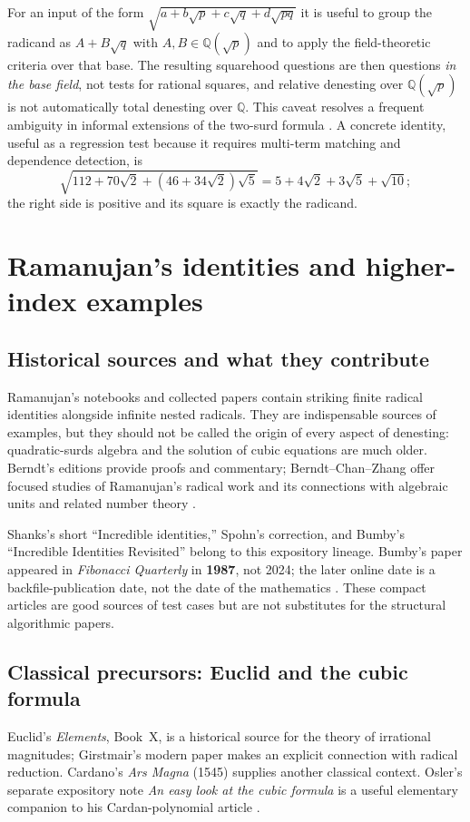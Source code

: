 \documentclass[11pt,oneside]{article}
\numberwithin{equation}{section}
\theoremstyle{definition}
\theoremstyle{remark}
\newcommand{\Q}{\mathbb{Q}}
\begin{document}
For an input of the form $\sqrt{a+b\sqrt p+c\sqrt q+d\sqrt{pq}}$ it is useful to group the radicand as $A+B\sqrt q$ with $A,B\in\Q(\sqrt p)$ and to apply the field-theoretic criteria over that base. The resulting squarehood questions are then questions \emph{in the base field}, not tests for rational squares, and relative denesting over $\Q(\sqrt p)$ is not automatically total denesting over $\Q$. This caveat resolves a frequent ambiguity in informal extensions of the two-surd formula \cite{bfht,mo}. A concrete identity, useful as a regression test because it requires multi-term matching and dependence detection, is
\begin{equation}\label{eq:multi}
\sqrt{112+70\sqrt2+(46+34\sqrt2)\sqrt5}=5+4\sqrt2+3\sqrt5+\sqrt{10};
\end{equation}
the right side is positive and its square is exactly the radicand.

\section{Ramanujan's identities and higher-index examples}\label{sec:ramanujan}

\subsection{Historical sources and what they contribute}
Ramanujan's notebooks and collected papers contain striking finite radical identities alongside infinite nested radicals. They are indispensable sources of examples, but they should not be called the origin of every aspect of denesting: quadratic-surds algebra and the solution of cubic equations are much older. Berndt's editions provide proofs and commentary; Berndt--Chan--Zhang offer focused studies of Ramanujan's radical work and its connections with algebraic units and related number theory \cite{ramanujan,berndt,berndt97,berndt98}.

Shanks's short ``Incredible identities,'' Spohn's correction, and Bumby's ``Incredible Identities Revisited'' belong to this expository lineage. Bumby's paper appeared in \emph{Fibonacci Quarterly} in \textbf{1987}, not 2024; the later online date is a backfile-publication date, not the date of the mathematics \cite{shanks,spohn,bumby}. These compact articles are good sources of test cases but are not substitutes for the structural algorithmic papers.

\subsection{Classical precursors: Euclid and the cubic formula}
Euclid's \emph{Elements}, Book~X, is a historical source for the theory of irrational magnitudes; Girstmair's modern paper makes an explicit connection with radical reduction. Cardano's \emph{Ars Magna} (1545) supplies another classical context. Osler's separate expository note \emph{An easy look at the cubic formula} is a useful elementary companion to his Cardan-polynomial article \cite{girstmair,oslercubic,osler}.
\end{document}
